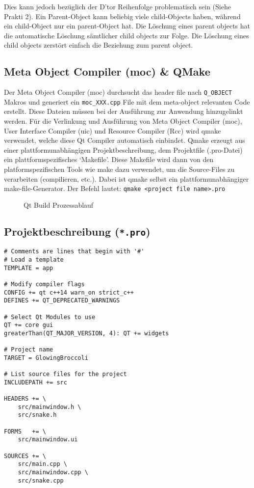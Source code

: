Dies kann jedoch bezüglich der D'tor Reihenfolge problematisch sein (Siehe Prakti 2).
Ein Parent-Object kann beliebig viele child-Objects haben, während ein child-Object nur ein parent-Object hat. Die Löschung eines parent objects hat die automatische Löschung sämtlicher child objects zur Folge. Die Löschung eines child objects zerstört einfach die Beziehung zum parent object. 

\subsection{Meta Object Compiler (moc) \& QMake}
Der Meta Object Compiler (moc) durchsucht das header file nach \lstinline{Q_OBJECT} Makros und generiert ein \texttt{moc\_XXX.cpp} File mit dem meta-object relevanten Code erstellt. Diese Dateien müssen bei der Ausführung zur Anwendung hinzugelinkt werden. Für die Verlinkung und Ausführung von Meta Object Compiler (moc), User Interface Compiler (uic) und Resource Compiler (Rcc) wird qmake verwendet, welche diese Qt Compiler automatisch einbindet. Qmake erzeugt aus einer plattformunabhängigen Projektbeschreibung, dem Projektfile (.pro-Datei) ein plattformspezifisches `Makefile'. Diese Makefile wird dann von den platformspezifischen Tools wie make dazu verwendet, um die Source-Files zu verarbeiten (compilieren, etc.). Dabei ist qmake selbst ein plattformunabhängiger make-file-Generator.
Der Befehl lautet: \texttt{qmake <project file name>.pro}

\begin{figure}[ht]
    \centering
    \caption{Qt Build Prozessablauf}
\end{figure}

\subsection{Projektbeschreibung (\texttt{*.pro})}
\begin{lstlisting}
# Comments are lines that begin with '#'
# Load a template
TEMPLATE = app

# Modify compiler flags
CONFIG += qt c++14 warn_on strict_c++
DEFINES += QT_DEPRECATED_WARNINGS

# Select Qt Modules to use
QT += core gui
greaterThan(QT_MAJOR_VERSION, 4): QT += widgets

# Project name
TARGET = GlowingBroccoli

# List source files for the project
INCLUDEPATH += src

HEADERS += \
    src/mainwindow.h \
    src/snake.h

FORMS   += \
    src/mainwindow.ui

SOURCES += \
    src/main.cpp \
    src/mainwindow.cpp \
    src/snake.cpp
\end{lstlisting}

